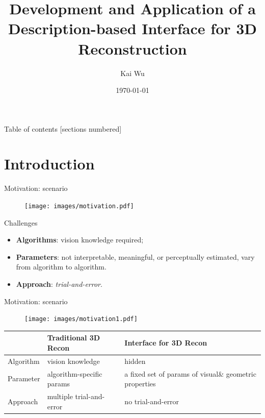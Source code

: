 \documentclass[10pt]{beamer}
\title[Interface of 3D Reconstruction]{Development and Application of a Description-based Interface for 3D Reconstruction} %
\author{Kai Wu}
\institute[UBC]
{
University of British Columbia \\ %
\medskip
kaywu@ece.ubc.ca \\ %
}
\date{\today}
\begin{document}
\begin{frame}
\maketitle
\end{frame}

\begin{frame}{Table of contents}
  [sections numbered]
  \tableofcontents[hideallsubsections]
\end{frame}


\section{Introduction}
\begin{frame}{Motivation: scenario}

\begin{figure}
\centering
\texttt{[image: images/motivation.pdf]}
\end{figure}

\begin{alertblock}{Challenges}
  \begin{itemize}
    \item \textbf{Algorithms}: vision knowledge required;
    \item \textbf{Parameters}: not interpretable, meaningful, or perceptually estimated, vary from algorithm to algorithm.
    \item \textbf{Approach}: \textit{trial-and-error}.
  \end{itemize}
\end{alertblock}

\end{frame}

\begin{frame}{Motivation: scenario}

\begin{figure}
\centering
\texttt{[image: images/motivation1.pdf]}
\end{figure}

\begin{table}
\centering
\begin{tabular}{lp{3.5cm}p{4cm}}
& Traditional 3D Recon & Interface for 3D Recon\\
\midrule
Algorithm & vision knowledge & hidden \\
Parameter & algorithm-specific params & a fixed set of params of visual\& geometric properties \\
Approach & multiple trial-and-error & no trial-and-error \\
\end{tabular}
\end{table}

\end{frame}
\end{document}
